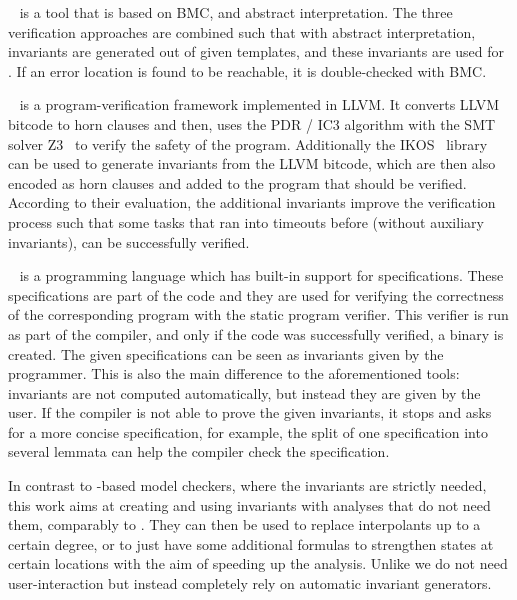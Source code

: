 \TWOLS{}~\cite{Brain:2LS} is a tool that is based on BMC, \Kinduction{} and abstract interpretation.
The three verification approaches are combined such that with abstract interpretation, invariants
are generated out of given templates, and these invariants are used for \Kinduction{}.
If an error location is found to be reachable, it is double-checked with BMC.

\SeaHorn{}~\cite{Gurfinkel:Seahorn} is a program-verification framework implemented in
LLVM\cite{LLVM}. It converts LLVM bitcode to horn clauses and then, uses the PDR / IC3
algorithm with the \ac{SMT} solver Z3~\cite{Hoder:SeahornPDR} to verify the safety of the program. Additionally
the IKOS~\cite{Brat:Ikos} library can be used to generate invariants from the LLVM bitcode,
which are then also encoded as horn clauses and added to the program that should be verified. According
to their evaluation, the additional invariants improve the verification process such that
some tasks that ran into timeouts before (without auxiliary invariants), can be successfully verified.

\Dafny{}~\cite{Leino:Dafny} is a programming language which has built-in support for
specifications. These specifications are part of the code and they are used for verifying
the correctness of the corresponding
program with the \Dafny{} static program verifier. This verifier is run as part of the
compiler, and only if the code was successfully verified, a binary is created. The given
specifications can be seen as invariants given by the programmer. This is also the main
difference to the aforementioned tools: invariants are not computed automatically, but
instead they are given by the user. If the compiler is not able to prove the given
invariants, it stops and asks for a more concise specification, for example, the split of
one specification into several lemmata can help the compiler check the
specification.

In contrast to \Kinduction{}-based model checkers, where the invariants are strictly needed,
this work aims at creating and using invariants with analyses that do not need them,
comparably to \SeaHorn{}. They can then be used to replace interpolants up to a certain
degree, or to just have some additional formulas to strengthen states at certain
locations with the aim of speeding up the analysis. Unlike \Dafny{} we do not need 
user-interaction but instead completely rely on automatic invariant generators.


